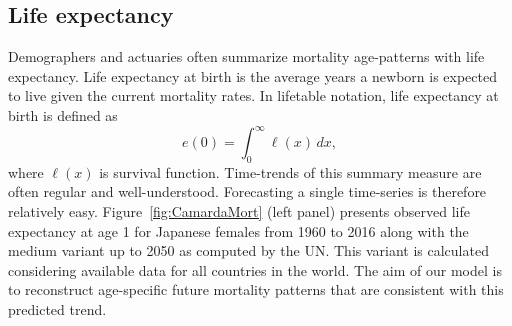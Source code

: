 \documentclass[a4paper,twoside, openright, 12pt, leqno]{article}
\begin{document}
\subsection{Life expectancy}

Demographers and actuaries often summarize mortality age-patterns with life expectancy. Life expectancy at birth is the average years a newborn is expected to live given the current mortality rates. In lifetable notation, life expectancy at birth is defined as
\begin{equation*}\label{eq:ex}
e(0)=\int_0^\infty\ell(x)\,dx,
\end{equation*}
where $\ell(x)$ is survival function. Time-trends of this summary measure are often regular and well-understood. Forecasting a single time-series is therefore relatively easy. Figure~\ref{fig:CamardaMort} (left panel) presents observed life expectancy at age 1 for Japanese females from 1960 to 2016 along with the medium variant up to 2050 as computed by the UN. This variant is calculated considering available data for all countries in the world.  The aim of our model is to reconstruct age-specific future mortality patterns that are consistent with this predicted trend.
\end{document}
